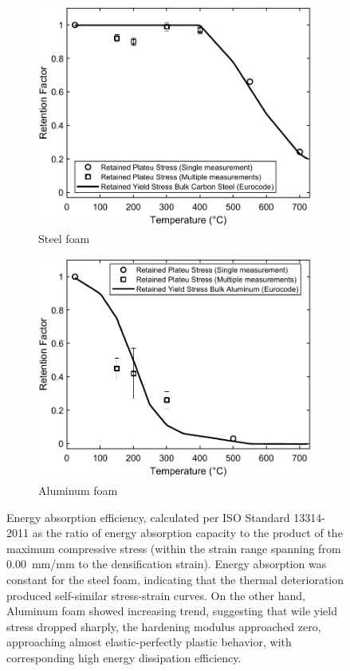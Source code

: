\documentclass[review]{elsarticle}
\begin{document}
\begin{figure}
	\centering
	\begin{subfigure}{0.50\textwidth}
		\centering
		\includegraphics[width=0.90\linewidth]
		{Tex-Figures/Fig23a-retentionFactor-Fe.pdf}
		\caption{Steel foam}
		\label{fig:retention_Steel}
	\end{subfigure}%
	\begin{subfigure}{0.50\textwidth}
		\centering
		\includegraphics[width=0.90\linewidth]
		{Tex-Figures/Fig23b-retentionFactor-Al.pdf}
		\caption{Aluminum foam}
		\label{retention_Al}
	\end{subfigure}
	\caption{ Energy absorption efficiency, calculated per ISO Standard 13314-2011 as the ratio of energy absorption capacity to the product of the maximum compressive stress (within the strain range spanning from 0.00~mm/mm to the densification strain). Energy absorption was constant for the steel foam, indicating that the thermal deterioration produced self-similar stress-strain curves. On the other hand, Aluminum foam showed increasing trend, suggesting that wile yield stress dropped sharply, the hardening modulus approached zero, approaching almost elastic-perfectly plastic behavior, with corresponding high energy dissipation efficiency.}
	\label{fig:retention}
\end{figure}
\end{document}

